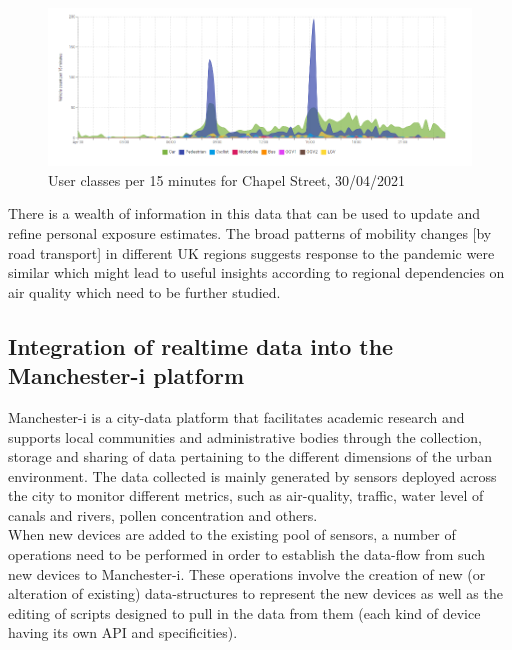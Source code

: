 \documentclass{article}
\begin{document}
\begin{figure}
	\centering
	\includegraphics[width=0.95\linewidth]{Figures/mobility_school2.png}
	\caption{User classes per 15 minutes for Chapel Street, 30/04/2021} \label{fig::school2}
\end{figure}

\noindent There is a wealth of information in this data that can be used to update and refine personal exposure estimates. The broad patterns of mobility changes [by road transport] in different UK regions suggests response to the pandemic were similar which might lead to useful insights according to regional dependencies on air quality which need to be further studied. \\

\clearpage
\subsection{Integration of realtime data into the Manchester-i platform}


\noindent Manchester-i is a city-data platform that facilitates academic research and supports local communities and administrative bodies through the collection, storage and sharing of data pertaining to the different dimensions of the urban environment. The data collected is mainly generated by sensors deployed across the city to monitor different metrics, such as air-quality, traffic, water level of canals and rivers, pollen concentration and others.\\

\noindent When new devices are added to the existing pool of sensors, a number of operations need to be performed in order to establish the data-flow from such new devices to Manchester-i. These operations involve the creation of new (or alteration of existing) data-structures to represent the new devices as well as the editing of scripts designed to pull in the data from them (each kind of device having its own API and specificities).
\end{document}
